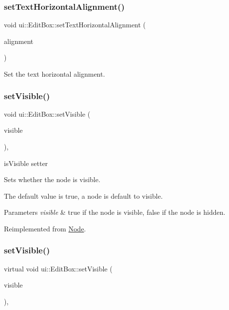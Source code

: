 \subsubsection{\texorpdfstring{set\+Text\+Horizontal\+Alignment()}{setTextHorizontalAlignment()}}
{\footnotesize\ttfamily void ui\+::\+Edit\+Box\+::set\+Text\+Horizontal\+Alignment (\begin{DoxyParamCaption}\item[{Text\+H\+Alignment}]{alignment }\end{DoxyParamCaption})}

Set the text horizontal alignment. \mbox{\label{classui_1_1EditBox_afd90efc8e80090f96e54f39520405883}} 
\subsubsection{\texorpdfstring{set\+Visible()}{setVisible()}\hspace{0.1cm}{\footnotesize\ttfamily [1/2]}}
{\footnotesize\ttfamily void ui\+::\+Edit\+Box\+::set\+Visible (\begin{DoxyParamCaption}\item[{bool}]{visible }\end{DoxyParamCaption})\hspace{0.3cm}{\ttfamily [override]}, {\ttfamily [virtual]}}



is\+Visible setter 

Sets whether the node is visible.

The default value is true, a node is default to visible.


\begin{DoxyParams}{Parameters}
{\em visible} & true if the node is visible, false if the node is hidden. \\
\hline
\end{DoxyParams}


Reimplemented from \hyperlink{classNode_ad8d9f6f838941a2a8ae18420757af158}{Node}.

\mbox{\label{classui_1_1EditBox_a73a03efc1b904b6386d037fdcdc7ff92}} 
\subsubsection{\texorpdfstring{set\+Visible()}{setVisible()}\hspace{0.1cm}{\footnotesize\ttfamily [2/2]}}
{\footnotesize\ttfamily virtual void ui\+::\+Edit\+Box\+::set\+Visible (\begin{DoxyParamCaption}\item[{bool}]{visible }\end{DoxyParamCaption})\hspace{0.3cm}{\ttfamily [override]}, {\ttfamily [virtual]}}



